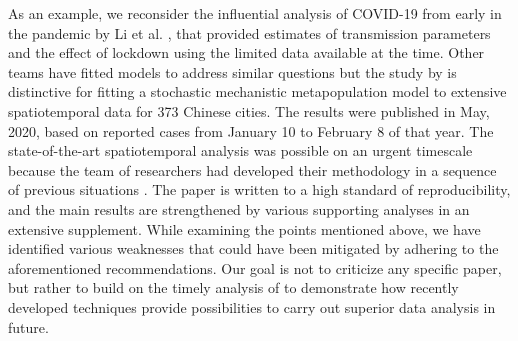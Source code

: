 \documentclass[12pt]{article}\usepackage[]{graphicx}\usepackage[]{xcolor}
\begin{document}
As an example, we reconsider the influential analysis of COVID-19 from early in the pandemic by Li et al. \cite{li20}, that provided estimates of transmission parameters and the effect of lockdown using the limited data available at the time.
Other teams have fitted models to address similar questions \cite{kramer20-science,yang21,brett23} but the study by \cite{li20} is distinctive for fitting a stochastic mechanistic metapopulation model to extensive spatiotemporal data for 373 Chinese cities.
The results were published in May, 2020, based on reported cases from January 10 to February 8 of that year.
The state-of-the-art spatiotemporal analysis was possible on an urgent timescale because the team of researchers had developed their methodology in a sequence of previous situations \cite{shaman12,yang14,yang15,pei18}.
The paper is written to a high standard of reproducibility, and the main results are strengthened by various supporting analyses in an extensive supplement.
While examining the points mentioned above, we have identified various weaknesses that could have been mitigated by adhering to the aforementioned recommendations.
Our goal is not to criticize any specific paper, but rather to build on the timely analysis of \cite{li20} to demonstrate how recently developed techniques provide possibilities to carry out superior data analysis in future.

\usetikzlibrary{positioning}
\usetikzlibrary {arrows.meta}
\usetikzlibrary{shapes.geometric}
\end{document}
